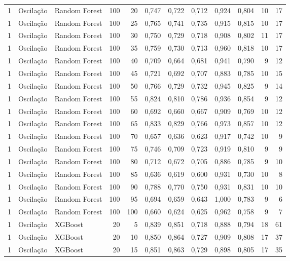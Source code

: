 \begin{longtable}{@{}rllrrrrrrrrr@{}}
1 & Oscilação & Random Forest & 100 & 20 & 0,747 & 0,722 & 0,712 & 0,924 & 0,804 & 10 & 17 \\
1 & Oscilação & Random Forest & 100 & 25 & 0,765 & 0,741 & 0,735 & 0,915 & 0,815 & 10 & 17 \\
1 & Oscilação & Random Forest & 100 & 30 & 0,750 & 0,729 & 0,718 & 0,908 & 0,802 & 11 & 17 \\
1 & Oscilação & Random Forest & 100 & 35 & 0,759 & 0,730 & 0,713 & 0,960 & 0,818 & 10 & 17 \\
1 & Oscilação & Random Forest & 100 & 40 & 0,709 & 0,664 & 0,681 & 0,941 & 0,790 & 9 & 12 \\
1 & Oscilação & Random Forest & 100 & 45 & 0,721 & 0,692 & 0,707 & 0,883 & 0,785 & 10 & 15 \\
1 & Oscilação & Random Forest & 100 & 50 & 0,766 & 0,729 & 0,732 & 0,945 & 0,825 & 9 & 14 \\
1 & Oscilação & Random Forest & 100 & 55 & 0,824 & 0,810 & 0,786 & 0,936 & 0,854 & 9 & 12 \\
1 & Oscilação & Random Forest & 100 & 60 & 0,692 & 0,660 & 0,667 & 0,909 & 0,769 & 10 & 12 \\
1 & Oscilação & Random Forest & 100 & 65 & 0,833 & 0,829 & 0,766 & 0,973 & 0,857 & 10 & 12 \\
1 & Oscilação & Random Forest & 100 & 70 & 0,657 & 0,636 & 0,623 & 0,917 & 0,742 & 10 & 9 \\
1 & Oscilação & Random Forest & 100 & 75 & 0,746 & 0,709 & 0,723 & 0,919 & 0,810 & 9 & 9 \\
1 & Oscilação & Random Forest & 100 & 80 & 0,712 & 0,672 & 0,705 & 0,886 & 0,785 & 9 & 10 \\
1 & Oscilação & Random Forest & 100 & 85 & 0,636 & 0,619 & 0,600 & 0,931 & 0,730 & 10 & 8 \\
1 & Oscilação & Random Forest & 100 & 90 & 0,788 & 0,770 & 0,750 & 0,931 & 0,831 & 10 & 10 \\
1 & Oscilação & Random Forest & 100 & 95 & 0,694 & 0,659 & 0,643 & 1,000 & 0,783 & 9 & 6 \\
1 & Oscilação & Random Forest & 100 & 100 & 0,660 & 0,624 & 0,625 & 0,962 & 0,758 & 9 & 7 \\
1 & Oscilação & XGBoost & 20 & 5 & 0,839 & 0,851 & 0,718 & 0,888 & 0,794 & 18 & 61 \\
1 & Oscilação & XGBoost & 20 & 10 & 0,850 & 0,864 & 0,727 & 0,909 & 0,808 & 17 & 37 \\
1 & Oscilação & XGBoost & 20 & 15 & 0,851 & 0,863 & 0,729 & 0,898 & 0,805 & 17 & 35 \\

\end{longtable}
